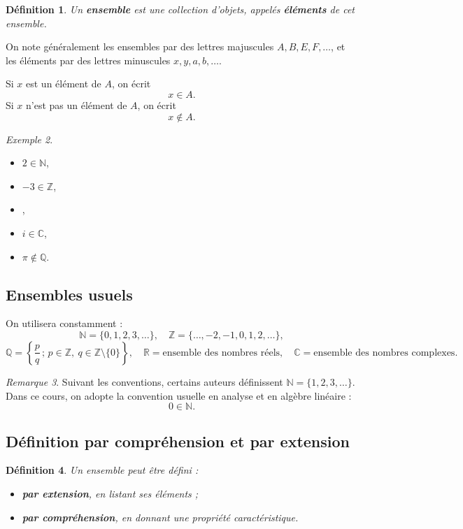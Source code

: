 \documentclass[11pt,a4paper]{article}
\newtheorem{definition}{Définition}[section]
\theoremstyle{remark}
\newtheorem{remarque}[definition]{Remarque}
\newtheorem{exemple}[definition]{Exemple}
\newcommand{\R}{\mathbb{R}}
\newcommand{\N}{\mathbb{N}}
\newcommand{\Z}{\mathbb{Z}}
\newcommand{\Q}{\mathbb{Q}}
\newcommand{\C}{\mathbb{C}}
\begin{document}
\begin{definition}
Un \textbf{ensemble} est une collection d’objets, appelés \textbf{éléments} de cet ensemble.
\end{definition}

On note généralement les ensembles par des lettres majuscules \(A,B,E,F,\dots\), et les éléments par des lettres minuscules \(x,y,a,b,\dots\).

Si \(x\) est un élément de \(A\), on écrit
\[
x\in A.
\]
Si \(x\) n’est pas un élément de \(A\), on écrit
\[
x\notin A.
\]

\begin{exemple}
\begin{itemize}
    \item \(2\in \N\),
    \item \(-3\in \Z\),
    \item {}\in \R\),
    \item \(i\in \C\),
    \item \(\pi \notin \Q\).
\end{itemize}
\end{exemple}

\subsection{Ensembles usuels}

On utilisera constamment :
\[
\N=\{0,1,2,3,\dots\},
\quad
\Z=\{\dots,-2,-1,0,1,2,\dots\},
\]
\[
\Q=\left\{\frac{p}{q}\,;\,p\in\Z,\ q\in\Z\setminus\{0\}\right\},
\quad
\R=\text{ensemble des nombres réels},
\quad
\C=\text{ensemble des nombres complexes}.
\]

\begin{remarque}
Suivant les conventions, certains auteurs définissent \(\N=\{1,2,3,\dots\}\). Dans ce cours, on adopte la convention usuelle en analyse et en algèbre linéaire :
\[
0\in \N.
\]
\end{remarque}

\subsection{Définition par compréhension et par extension}

\begin{definition}
Un ensemble peut être défini :
\begin{itemize}
    \item \textbf{par extension}, en listant ses éléments ;
    \item \textbf{par compréhension}, en donnant une propriété caractéristique.
\end{itemize}
\end{definition}
\end{document}
